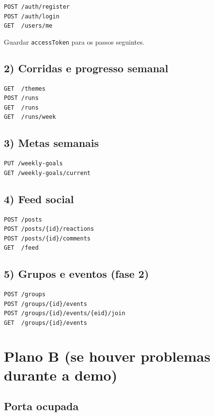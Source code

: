 \documentclass[11pt,a4paper]{article}
\begin{document}
\begin{verbatim}
POST /auth/register
POST /auth/login
GET  /users/me
\end{verbatim}

Guardar \texttt{accessToken} para os passos seguintes.

\subsection{2) Corridas e progresso semanal}

\begin{verbatim}
GET  /themes
POST /runs
GET  /runs
GET  /runs/week
\end{verbatim}

\subsection{3) Metas semanais}

\begin{verbatim}
PUT /weekly-goals
GET /weekly-goals/current
\end{verbatim}

\subsection{4) Feed social}

\begin{verbatim}
POST /posts
POST /posts/{id}/reactions
POST /posts/{id}/comments
GET  /feed
\end{verbatim}

\subsection{5) Grupos e eventos (fase 2)}

\begin{verbatim}
POST /groups
POST /groups/{id}/events
POST /groups/{id}/events/{eid}/join
GET  /groups/{id}/events
\end{verbatim}

\section{Plano B (se houver problemas durante a demo)}

\subsection{Porta ocupada}
\end{document}
